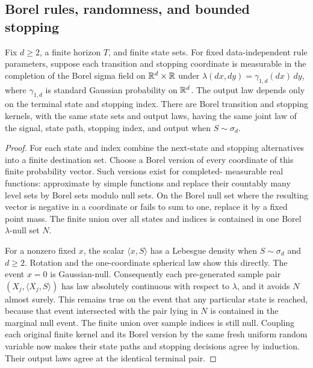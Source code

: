 \subsection{Borel rules, randomness, and bounded stopping}

\begin{lemma}\label{lem:borel-rules}
Fix $d\ge2$, a finite horizon $T$, and finite state sets. For fixed
data-independent rule parameters, suppose each transition and stopping
coordinate is measurable in the completion of the Borel sigma field on
$\mathbb R^d\times\mathbb R$ under
$\lambda(dx,dy)=\gamma_{1,d}(dx)\,dy$, where $\gamma_{1,d}$ is standard
Gaussian probability on $\mathbb R^d$. The output law depends only on the
terminal state and stopping index. There are Borel transition and stopping
kernels, with the same state sets and output laws, having the same joint law
of the signal, state path, stopping index, and output when $S\sim\sigma_d$.
\end{lemma}

\begin{proof}
For each state and index combine the next-state and stopping alternatives
into a finite destination set. Choose a Borel version of every coordinate
of this finite probability vector. Such versions exist for completed-
measurable real functions: approximate by simple functions and replace
their countably many level sets by Borel sets modulo null sets. On the Borel
null set where the resulting vector is negative in a coordinate or fails
to sum to one, replace it by a fixed point mass. The finite union over all
states and indices is contained in one Borel $\lambda$-null set $N$.

For a nonzero fixed $x$, the scalar $\langle x,S\rangle$ has a Lebesgue
density when $S\sim\sigma_d$ and $d\ge2$. Rotation and the one-coordinate
spherical law show this directly. The event $x=0$ is Gaussian-null.
Consequently each pre-generated sample pair
$(X_j,\langle X_j,S\rangle)$ has law absolutely continuous with respect
to $\lambda$, and it avoids $N$ almost surely. This remains true on the
event that any particular state is reached, because that event intersected
with the pair lying in $N$ is contained in the marginal null event.
The finite union over sample indices is still null. Coupling each original
finite kernel and its Borel version by the same fresh uniform random
variable now makes their state paths and stopping decisions agree by
induction. Their output laws agree at the identical terminal pair.
\end{proof}

